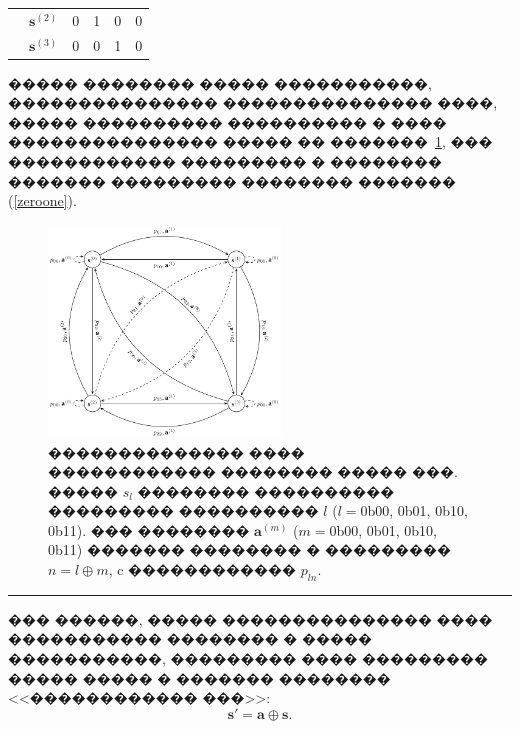 \documentclass[11pt]{ubs}
\begin{document}
\begin{example}
\begin{table}[tbh]
{\begin{tabular}{|*6{c|}}
        \cline{2-6}
                                            & $\textbf{s}^{(2)}$                                                                                        & 0                  & 1                  & 0                  & 0                  \\
        \cline{2-6}
                                            & $\textbf{s}^{(3)}$                                                                                        & 0                  & 0                  & 1                  & 0                  \\
        \hline
      \end{tabular} }
  \end{table}
  \noindent
  ����� �������� ����� �����������, ��������������� ��������������� ����, ����� ���������� ���������� � ���� ��������������� ����� �� �������~\ref{fig:stohgraph22}, ��� ������������ ��������� � �������� ������� ��������� ��������  ������� (\ref{zeroone}).

  \begin{figure}[tbph]
    \centering
    \includegraphics[width =0.55\textwidth]{stog_graph_4state}
    \caption{�������������� ���� ������������ �������� ����� ���. ����� $s_{l}$ �������� ���������� ��������� ���������� $l$ ($l = $0b00, 0b01, 0b10, 0b11).  ��� �������� $\textbf{a}^{(m)}$  ($m = $0b00, 0b01, 0b10, 0b11) ������� �������� � ��������� $n = l\oplus m$, c ������������ $p_{ln}$.}
    \label{fig:stohgraph22}
  \end{figure}

\noindent
\rule{0.95\textwidth}{0em}
\end{example}



��� ������, ����� ��������������� ���� ����������� �������� � ����� �����������, ��������� ���� ��������� ����� ����� � ������� �������� <<������������ ���>>:
\begin{equation}\label{zeroone}
  \textbf{s}'=\textbf{a} \oplus \textbf{s}.
\end{equation}
\end{document}
